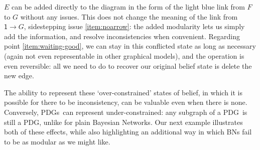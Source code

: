 \documentclass{article}
\newcommand\changed[1]{{\color{note-fg} #1}}
\newcommand{\MN}{PDG}%
\newcommand{\MNs}{PDGs}
\begin{document}
\begin{example}
		\changed{$E$} can be added directly to the diagram in the form of the light blue link from $F$ to $G$ without any issues. This does not change the meaning of the link from $\mathsf 1 \to G$, sidestepping issue \ref{item:noarrow}: the added modularity lets us simply add the information, and resolve inconsistencies when convenient. 
		Regarding point \ref{item:waiting-good}, we can stay in this conflicted state as long as necessary (again not even representable in other graphical models), and the operation is even reversible: all we need to do to recover our original belief state is delete the new edge.			
	\end{example}			
	
	
	
	
%		
%		
	
	The ability to represent these `over-constrained' states of belief, in which it is possible for there to be inconsistency, can be valuable even when there is none. Conversely, \MNs\ can represent under-constrained: any subgraph of a \MN\ is still a \MN, unlike for plain Bayesian Networks. Our next example illustrates both of these effects, while also highlighting an additional way in which BNs fail to be as modular as we might like.
\end{document}
